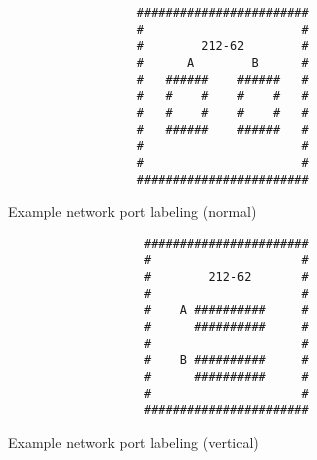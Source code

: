 \setlength{\columnsep}{50pt}
\begin{multicols}{2}
	\begin{figure}[H]
		\centering

		\begin{verbatim}
			      ########################
			      #                      #
			      #        212-62        #
			      #      A        B      #
			      #   ######    ######   #
			      #   #    #    #    #   #
			      #   #    #    #    #   #
			      #   ######    ######   #
			      #                      #
			      #                      #
			      ########################
		\end{verbatim}

		\caption{Example network port labeling (normal)}
	\end{figure}

	\begin{figure}[H]
		\centering

		\begin{verbatim}
			       #######################
			       #                     #
			       #        212-62       #
			       #                     #
			       #    A ##########     #
			       #      ##########     #
			       #                     #
			       #    B ##########     #
			       #      ##########     #
			       #                     #
			       #######################
		\end{verbatim}

		\caption{Example network port labeling (vertical)}
	\end{figure}
\end{multicols}
